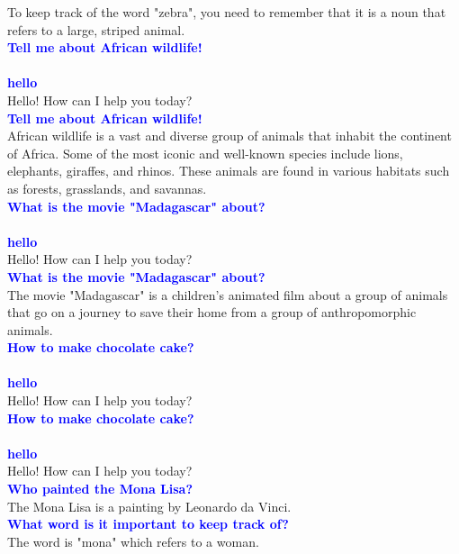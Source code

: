 To keep track of the word "zebra", you need to remember that it is a noun that refers to a large, striped animal.\\\textcolor{blue}{\textbf{Tell me about African wildlife!}}\\\\\textcolor{blue}{\textbf{hello}}\\
Hello! How can I help you today?\\\textcolor{blue}{\textbf{Tell me about African wildlife!}}\\
African wildlife is a vast and diverse group of animals that inhabit the continent of Africa. Some of the most iconic and well-known species include lions, elephants, giraffes, and rhinos. These animals are found in various habitats such as forests, grasslands, and savannas.\\\textcolor{blue}{\textbf{What is the movie "Madagascar" about?}}\\\\\textcolor{blue}{\textbf{hello}}\\
Hello! How can I help you today?\\\textcolor{blue}{\textbf{What is the movie "Madagascar" about?}}\\
The movie "Madagascar" is a children's animated film about a group of animals that go on a journey to save their home from a group of anthropomorphic animals.\\\textcolor{blue}{\textbf{How to make chocolate cake?}}\\\\\textcolor{blue}{\textbf{hello}}\\
Hello! How can I help you today?\\\textcolor{blue}{\textbf{How to make chocolate cake?}}\\\\\textcolor{blue}{\textbf{hello}}\\
Hello! How can I help you today?\\\textcolor{blue}{\textbf{Who painted the Mona Lisa?}}\\
The Mona Lisa is a painting by Leonardo da Vinci.\\\textcolor{blue}{\textbf{What word is it important to keep track of?}}\\
The word is "mona" which refers to a woman.\\